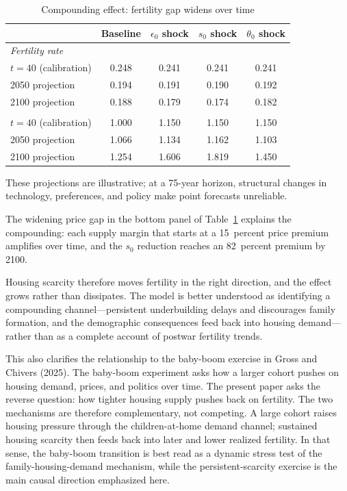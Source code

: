 \begin{table}[htbp]
\centering
\caption{Compounding effect: fertility gap widens over time}
\label{tab:projection_results}
\small
\begin{tabular}{l cccc}
\toprule
 & Baseline & $\epsilon_0$ shock & $s_0$ shock & $\theta_0$ shock \\
\midrule
\multicolumn{5}{l}{\textit{Fertility rate}} \\
$t = 40$ (calibration) & 0.248 & 0.241 & 0.241 & 0.241 \\
2050 projection & 0.194 & 0.191 & 0.190 & 0.192 \\
2100 projection & 0.188 & 0.179 & 0.174 & 0.182 \\
\addlinespace
\multicolumn{5}{l}{\textit{House-price index}} \\
$t = 40$ (calibration) & 1.000 & 1.150 & 1.150 & 1.150 \\
2050 projection & 1.066 & 1.134 & 1.162 & 1.103 \\
2100 projection & 1.254 & 1.606 & 1.819 & 1.450 \\
\bottomrule
\end{tabular}
\end{table}

These projections are illustrative; at a 75-year horizon, structural changes in technology,
preferences, and policy make point forecasts unreliable.

The widening price gap in the bottom panel of Table~\ref{tab:projection_results} explains
the compounding: each supply margin that starts at a 15~percent price premium amplifies
over time, and the $s_0$ reduction reaches an 82~percent premium by 2100.

Housing scarcity therefore moves fertility in the right direction, and the effect grows
rather than dissipates. The model is better understood as identifying a compounding
channel---persistent underbuilding delays and discourages family formation, and the
demographic consequences feed back into housing demand---rather than as a complete account
of postwar fertility trends.

This also clarifies the relationship to the baby-boom exercise in Gross and Chivers
(2025). The baby-boom experiment asks how a larger cohort pushes on housing demand,
prices, and politics over time. The present paper asks the reverse question: how tighter
housing supply pushes back on fertility. The two mechanisms are therefore complementary,
not competing. A large cohort raises housing pressure through the children-at-home demand
channel; sustained housing scarcity then feeds back into later and lower realized
fertility. In that sense, the baby-boom transition is best read as a dynamic stress test
of the family-housing-demand mechanism, while the persistent-scarcity exercise is the main
causal direction emphasized here.

